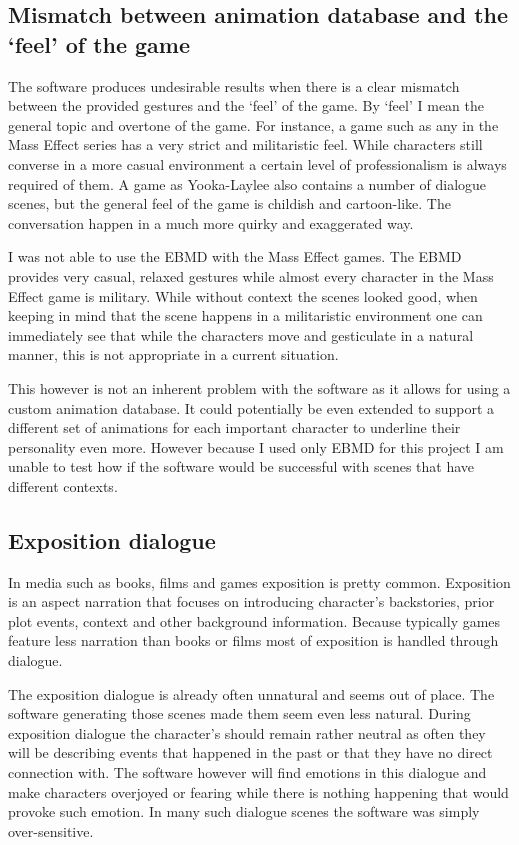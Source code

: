 \subsection{Mismatch between animation database and the `feel' of the game}
The software produces undesirable results when there is a clear mismatch between the provided gestures and the `feel' of the game. By `feel' I mean the general topic and overtone of the game. For instance, a game such as any in the Mass Effect series has a very strict and militaristic feel. While characters still converse in a more casual environment a certain level of professionalism is always required of them. A game as Yooka-Laylee also contains a number of dialogue scenes, but the general feel of the game is childish and cartoon-like. The conversation happen in a much more quirky and exaggerated way.

I was not able to use the EBMD with the Mass Effect games. The EBMD provides very casual, relaxed gestures while almost every character in the Mass Effect game is military. While without context the scenes looked good, when keeping in mind that the scene happens in a militaristic environment one can immediately see that while the characters move and gesticulate in a natural manner, this is not appropriate in a current situation.

This however is not an inherent problem with the software as it allows for using a custom animation database. It could potentially be even extended to support a different set of animations for each important character to underline their personality even more. However because I used only EBMD for this project I am unable to test how if the software would be successful with scenes that have different contexts.

\subsection{Exposition dialogue}
In media such as books, films and games exposition is pretty common. Exposition is an aspect narration that focuses on introducing character's backstories, prior plot events, context and other background information. Because typically games feature less narration than books or films most of exposition is handled through dialogue.

The exposition dialogue is already often unnatural and seems out of place. The software generating those scenes made them seem even less natural. During exposition dialogue the character's should remain rather neutral as often they will be describing events that happened in the past or that they have no direct connection with. The software however will find emotions in this dialogue and make characters overjoyed or fearing while there is nothing happening that would provoke such emotion. In many such dialogue scenes the software was simply over-sensitive.



